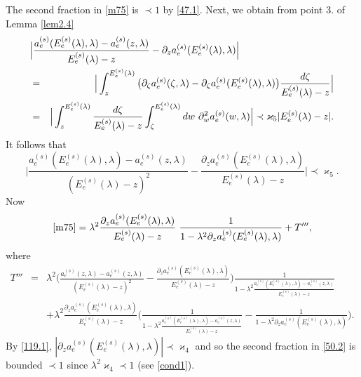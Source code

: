 \documentclass[letterpaper,onecolumn,11pt,accepted=2021-12-09]{quantumarticle}
\numberwithin{equation}{section}
\newcommand{\aes}{a_e^{(s)}}
\newcommand{\Ees}{E_e^{(s)}(\lambda)}
\begin{document}
The second fraction in \eqref{m75} is $\prec 1$ by  \eqref{47.1}. Next, we obtain from point 3. of Lemma  \ref{lem2.4}
\begin{eqnarray}
	\lefteqn{
\Big| \frac{\aes(E_e^{(s)}(\lambda),\lambda) - \aes(z,\lambda)}{E_e^{(s)}(\lambda)-z} -\partial_z \aes(\Ees,\lambda) \Big| }\nonumber\\
&=&\Big| \int_z^{\Ees} \big( \partial_\zeta \aes(\zeta,\lambda) - \partial_\zeta \aes(\Ees,\lambda)\big) \frac{d\zeta}{\Ees-z}\Big|\nonumber\\
&=&\Big| \int_z^{\Ees} \frac{d\zeta}{\Ees-z} \int_\zeta^{\Ees} dw \ \partial_w^2  \aes(w,\lambda)  \Big| \prec \varkappa_5 |\Ees-z|.
\label{49.1}
\end{eqnarray}
It follows that 
\begin{equation}
\Big| \frac{\aes(E_e^{(s)}(\lambda),\lambda) - \aes(z,\lambda)}{(E_e^{(s)}(\lambda)-z)^2} -\frac{\partial_z \aes(\Ees,\lambda)}{\Ees-z} \Big| \prec  \varkappa_5.
\label{50.1}
\end{equation}
Now
\begin{equation}
 \eqref{m75} = \lambda^2 \frac{\partial_z\aes(\Ees,\lambda)}{\Ees-z}\  \frac{1}{1-\lambda^2\partial_z
  \aes(\Ees,\lambda)} +T''',
 \label{50.2}
\end{equation}
where 
\begin{eqnarray}
T''' &=&\lambda^2 \Big( \frac{\aes(z,\lambda)-\aes(z,\lambda)}{(\Ees-z)^2}  - \frac{\partial_z \aes(\Ees,\lambda)}{\Ees-z}\Big)\frac{1}{1-\lambda^2 \frac{\aes(\Ees,\lambda)-
\aes(z,\lambda)}{\Ees-z}} \label{51.1}\\
&&+ \lambda^2\frac{\partial_z \aes(\Ees,\lambda)}{\Ees -z} \Big(\frac{1}{1-\lambda^2 \frac{\aes(\Ees,\lambda)-
		\aes(z,\lambda)}{\Ees-z}}- \frac{1}{1-\lambda^2 \partial_z\aes(\Ees,\lambda)}\Big).
\nonumber
\end{eqnarray}
By \eqref{119.1}, $|\partial_z\aes(\Ees,\lambda)|\prec \varkappa_4$  and so the second fraction in \eqref{50.2} is bounded $\prec 1$ since $\lambda^2 \varkappa_4\prec 1$ (see \eqref{cond1}). 
\end{document}
